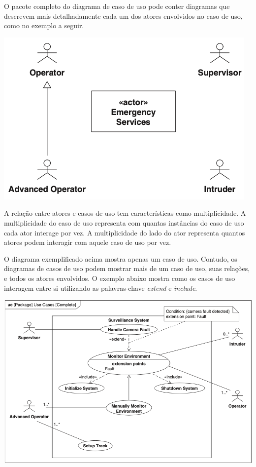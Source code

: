 O pacote completo do diagrama de caso de uso pode conter diagramas que descrevem mais detalhadamente cada um dos atores envolvidos no caso de uso, como no exemplo a seguir.

\includegraphics[width=\textwidth,height=\textheight,keepaspectratio]{imagens/diagrama-caso-de-uso-2.png}

A relação entre atores e casos de uso tem características como multiplicidade. A multiplicidade do caso de uso representa com quantas instâncias do caso de uso cada ator interage por vez. A multiplicidade do lado do ator representa quantos atores podem interagir com aquele caso de uso por vez.

O diagrama exemplificado acima mostra apenas um caso de uso. Contudo, os diagramas de casos de uso podem mostrar mais de um caso de uso, suas relações, e todos os atores envolvidos. O exemplo abaixo mostra como os casos de uso interagem entre si utilizando as palavras-chave \textit{extend} e \textit{include}.

\includegraphics[width=\textwidth,height=\textheight,keepaspectratio]{imagens/diagrama-caso-de-uso-3.png}

